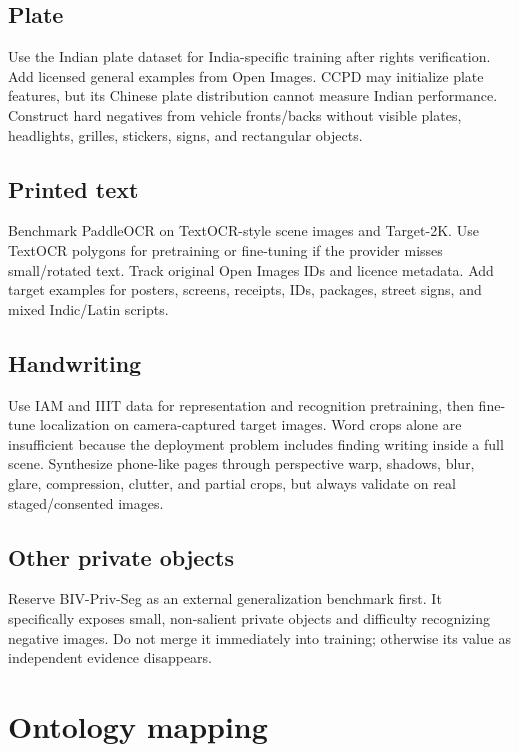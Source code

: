 \subsection{Plate}

Use the Indian plate dataset for India-specific training after rights verification. Add licensed general examples from Open Images. CCPD may initialize plate features, but its Chinese plate distribution cannot measure Indian performance. Construct hard negatives from vehicle fronts/backs without visible plates, headlights, grilles, stickers, signs, and rectangular objects.

\subsection{Printed text}

Benchmark PaddleOCR on TextOCR-style scene images and Target-2K. Use TextOCR polygons for pretraining or fine-tuning if the provider misses small/rotated text. Track original Open Images IDs and licence metadata. Add target examples for posters, screens, receipts, IDs, packages, street signs, and mixed Indic/Latin scripts.

\subsection{Handwriting}

Use IAM and IIIT data for representation and recognition pretraining, then fine-tune localization on camera-captured target images. Word crops alone are insufficient because the deployment problem includes finding writing inside a full scene. Synthesize phone-like pages through perspective warp, shadows, blur, glare, compression, clutter, and partial crops, but always validate on real staged/consented images.

\subsection{Other private objects}

Reserve BIV-Priv-Seg as an external generalization benchmark first. It specifically exposes small, non-salient private objects and difficulty recognizing negative images. Do not merge it immediately into training; otherwise its value as independent evidence disappears.

\section{Ontology mapping}

